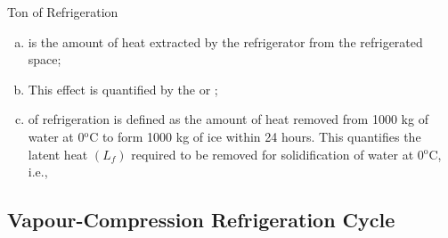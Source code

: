 \documentclass[10pt,compress,handout,unknownkeysallowed]{beamer}
\begin{document}
\begin{frame}
{\begin{block}{\begin{center}\scriptsize Ton of Refrigeration\end{center}}
\begin{enumerate}[(a)]
           \item<4->  is the amount of heat extracted by the refrigerator from the refrigerated space;
           \item<4-> This effect is quantified by the  or ;
           \item<4->  of refrigeration is defined as the amount of heat removed from 1000 kg of water at 0$^{\text{o}}$C to form 1000 kg of ice within 24 hours. This quantifies the latent heat $\left(L_{f}\right)$ required to be removed for solidification of water at 0$^{\text{o}}$C, i.e.,
      \end{enumerate}
     \end{block}}
\end{frame}

\subsection{Vapour-Compression Refrigeration Cycle}
\end{document}
